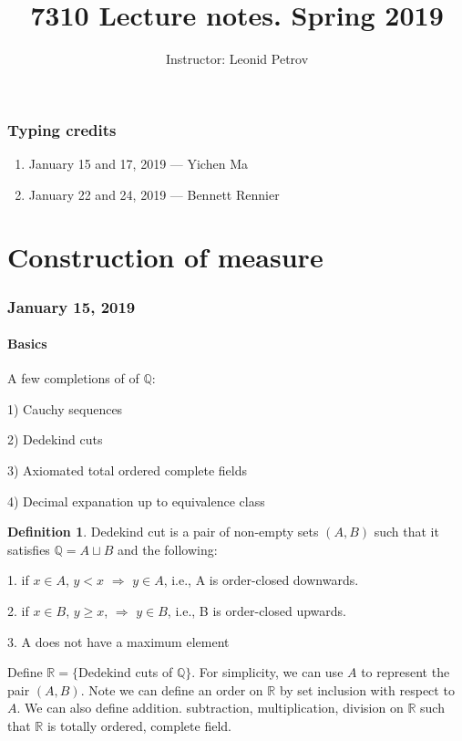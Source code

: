 \documentclass{article}
\title{7310 Lecture notes. Spring 2019}
\author{Instructor: Leonid Petrov}
\date{}
\theoremstyle{definition}
\newtheorem{definition}[theorem]{Definition}
\begin{document}
\maketitle

\section*{Typing credits}

\begin{enumerate}
	\item January 15 and 17, 2019 --- Yichen Ma
	\item January 22 and 24, 2019 --- Bennett Rennier
\end{enumerate}

\tableofcontents

\part{Construction of measure}

\section{January 15, 2019}

\subsection{Basics}

A few completions of of $\mathbb{Q}$:

1) Cauchy sequences

2) Dedekind cuts

3) Axiomated total ordered complete fields

4) Decimal expanation up to equivalence class


\begin{definition}
Dedekind cut is a pair of non-empty sets $(A,B)$ such that it satisfies $\mathbb{Q} = A \sqcup B$ and the following:

1. if $x \in A$, $y < x$ $\Longrightarrow$ $y \in A$, i.e., A is order-closed downwards.

2. if $x \in B$, $y \geq x$, $\Longrightarrow$ $y \in B$, i.e., B is order-closed upwards.

3. A does not have a maximum element
\end{definition}
Define $\mathbb{R} = \{$Dedekind cuts of $\mathbb{Q}\}$. For simplicity, we can use $A$ to represent the pair $(A,B)$. Note we can define an order on $\mathbb{R}$ by set inclusion with respect to $A$. We can also define addition. subtraction, multiplication, division on $\mathbb{R}$ such that $\mathbb{R}$ is totally ordered, complete field.
\end{document}
